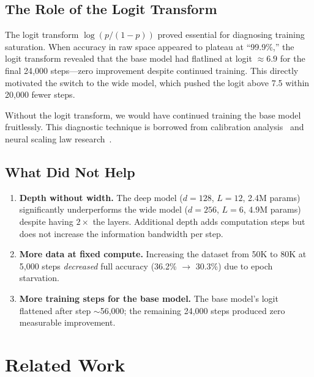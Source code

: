 \documentclass[11pt,a4paper]{article}
\begin{document}
\subsection{The Role of the Logit Transform}

The logit transform $\log(p/(1-p))$ proved essential for diagnosing training saturation.
When accuracy in raw space appeared to plateau at ``99.9\%,'' the logit transform revealed that the base model had flatlined at logit $\approx 6.9$ for the final 24{,}000 steps---zero improvement despite continued training.
This directly motivated the switch to the wide model, which pushed the logit above 7.5 within 20{,}000 fewer steps.

Without the logit transform, we would have continued training the base model fruitlessly.
This diagnostic technique is borrowed from calibration analysis~\cite{guo2017calibration} and neural scaling law research~\cite{kaplan2020scaling}.

\subsection{What Did Not Help}

\begin{enumerate}
  \item \textbf{Depth without width.} The deep model ($d{=}128$, $L{=}12$, 2.4M params) significantly underperforms the wide model ($d{=}256$, $L{=}6$, 4.9M params) despite having $2\times$ the layers.
  Additional depth adds computation steps but does not increase the information bandwidth per step.

  \item \textbf{More data at fixed compute.} Increasing the dataset from 50K to 80K at 5{,}000 steps \emph{decreased} full accuracy (36.2\% $\to$ 30.3\%) due to epoch starvation.

  \item \textbf{More training steps for the base model.} The base model's logit flattened after step $\sim$56{,}000; the remaining 24{,}000 steps produced zero measurable improvement.
\end{enumerate}

\section{Related Work}
\label{sec:related}
\end{document}
